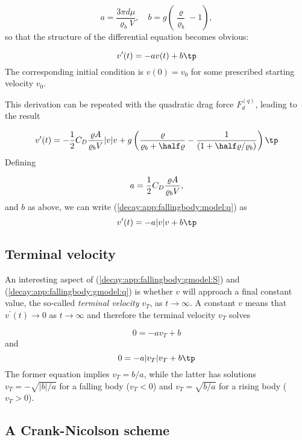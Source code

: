 \documentclass[graybox,sectrefs,envcountresetchap,open=right,final]{svmonodo}
\begin{document}
\begin{equation}
a = \frac{3\pi d\mu}{\varrho_b V},\quad
b = g\left(\frac{\varrho}{\varrho_b} -1\right),
\end{equation}
so that the structure of the differential equation becomes obvious:

\begin{equation}
v^{\prime}(t) = -av(t) + b
\label{decay:app:fallingbody:gmodel:S}
\tp
\end{equation}
The corresponding initial condition is $v(0)=v_0$ for some prescribed
starting velocity $v_0$.

This derivation can be repeated with the quadratic drag force
$F_d^{(q)}$, leading to the result

\begin{equation}
v^{\prime}(t) =
-{1\over2}C_D{\varrho A\over\varrho_b V}|v|v +
g\left(\frac{\varrho}{\varrho_b +\half\varrho} - \frac{1}{(1 +\half\varrho/\varrho_b)}\right)
\tp
\label{decay:app:fallingbody:model:q}
\end{equation}
Defining

\begin{equation}
a = {1\over2}C_D{\varrho A\over\varrho_b V},
\end{equation}
and $b$ as above, we can write (\ref{decay:app:fallingbody:model:q}) as
\begin{equation}
v^{\prime}(t) = -a|v|v + b
\tp
\label{decay:app:fallingbody:gmodel:q}
\end{equation}


\subsection{Terminal velocity}

An interesting aspect of (\ref{decay:app:fallingbody:gmodel:S}) and
(\ref{decay:app:fallingbody:gmodel:q}) is whether $v$ will approach
a final constant value,
the so-called \emph{terminal velocity} $v_T$, as $t\rightarrow\infty$.
A constant $v$ means that
$v^{\prime}(t)\rightarrow 0$ as $t\rightarrow\infty$ and therefore
the terminal velocity $v_T$ solves

\[ 0 = -av_T + b \]
and
\[ 0 = -a|v_T|v_T + b\tp \]
The former equation implies $v_T = b/a$, while the latter has solutions
$v_T =-\sqrt{|b|/a}$ for a falling body ($v_T < 0$) and
$v_T = \sqrt{b/a}$ for a rising body ($v_T>0$).

\subsection{A Crank-Nicolson scheme}
\end{document}
